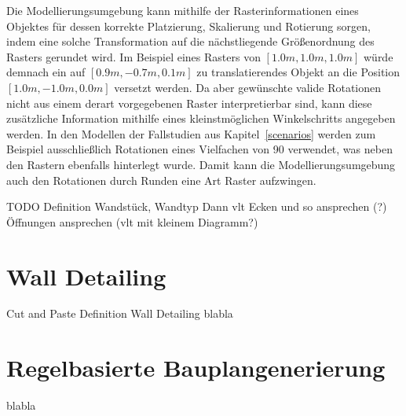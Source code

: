 Die Modellierungsumgebung kann mithilfe der Rasterinformationen eines Objektes für dessen korrekte Platzierung, Skalierung und Rotierung sorgen, indem eine solche Transformation auf die nächstliegende Größenordnung des Rasters gerundet wird.
Im Beispiel eines Rasters von \([1.0m, 1.0m, 1.0m]\) würde demnach ein auf \([0.9m, -0.7m, 0.1m]\) zu translatierendes Objekt an die Position \([1.0m, -1.0m, 0.0m]\) versetzt werden.
Da aber gewünschte valide Rotationen nicht aus einem derart vorgegebenen Raster interpretierbar sind, kann diese zusätzliche Information mithilfe eines kleinstmöglichen Winkelschritts angegeben werden.
In den Modellen der Fallstudien aus Kapitel~\ref{scenarios} werden zum Beispiel ausschließlich Rotationen eines Vielfachen von 90\degree{} verwendet, was neben den Rastern ebenfalls hinterlegt wurde.
Damit kann die Modellierungsumgebung auch den Rotationen durch Runden eine Art Raster aufzwingen.

TODO Definition Wandstück, Wandtyp
Dann vlt Ecken und so ansprechen (?)
Öffnungen ansprechen (vlt mit kleinem Diagramm?)

\section{Wall Detailing}
Cut and Paste Definition Wall Detailing
blabla

\section{Regelbasierte Bauplangenerierung}
blabla
